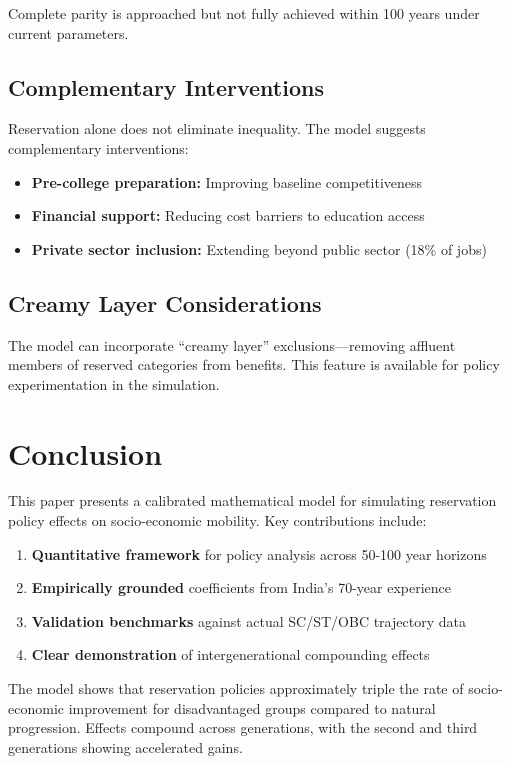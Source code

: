 \documentclass[10pt,twocolumn]{article}
\begin{document}
Complete parity is approached but not fully achieved within 100 years under current parameters.

\subsection{Complementary Interventions}

Reservation alone does not eliminate inequality. The model suggests complementary interventions:

\begin{itemize}
    \item \textbf{Pre-college preparation:} Improving baseline competitiveness
    \item \textbf{Financial support:} Reducing cost barriers to education access
    \item \textbf{Private sector inclusion:} Extending beyond public sector (18\% of jobs)
\end{itemize}

\subsection{Creamy Layer Considerations}

The model can incorporate ``creamy layer'' exclusions—removing affluent members of reserved categories from benefits. This feature is available for policy experimentation in the simulation.

\section{Conclusion}

This paper presents a calibrated mathematical model for simulating reservation policy effects on socio-economic mobility. Key contributions include:

\begin{enumerate}
    \item \textbf{Quantitative framework} for policy analysis across 50-100 year horizons
    \item \textbf{Empirically grounded} coefficients from India's 70-year experience
    \item \textbf{Validation benchmarks} against actual SC/ST/OBC trajectory data
    \item \textbf{Clear demonstration} of intergenerational compounding effects
\end{enumerate}

The model shows that reservation policies approximately triple the rate of socio-economic improvement for disadvantaged groups compared to natural progression. Effects compound across generations, with the second and third generations showing accelerated gains.
\end{document}
